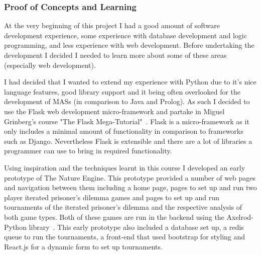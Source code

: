 \documentclass[]{final_report}
\begin{document}
\subsubsection{Proof of Concepts and Learning}
At the very beginning of this project I had a good amount of software development experience, some experience with database development and logic programming, and less experience with web development. Before undertaking the development I decided I needed to learn more about some of these areas (especially web development).\par 
I had decided that I wanted to extend my experience with Python due to it's nice language features, good library support and it being often overlooked for the development of MASs (in comparison to Java and Prolog). As such I decided to use the Flask web development micro-framework and partake in Miguel Grinberg's course "The Flask Mega-Tutorial"~\cite{flask_tut}. Flask is a micro-framework as it only includes a minimal amount of functionality in comparison to frameworks such as Django. Nevertheless Flask is extensible and there are a lot of libraries a programmer can use to bring in required functionality.\par 
Using inspiration and the techniques learnt in this course I developed an early prototype of The Nature Engine. This prototype provided a number of web pages and navigation between them including a home page, pages to set up and run two player iterated prisoner's dilemma games and pages to set up and run tournaments of the iterated prisoner's dilemma and the respective analysis of both game types. Both of these games are run in the backend using the Axelrod-Python library~\cite{axelrodproject}. This early prototype also included a database set up, a redis queue to run the tournaments, a front-end that used bootstrap for styling and React.js for a dynamic form to set up tournaments.\par
\end{document}
